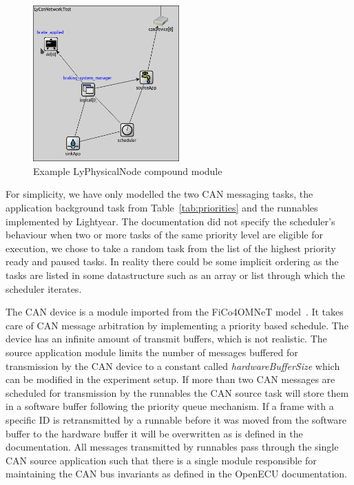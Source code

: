 \begin{figure}[htb]
    \centering
    \includegraphics[width=0.5\textwidth]{images/LyPhysicalNode_example.png}
    \caption{Example LyPhysicalNode compound module}
    \label{fig:lyphysicalnode}
\end{figure}

For simplicity, we have only modelled the two CAN messaging tasks, the application background task from Table~\ref{tab:priorities} and the runnables implemented by Lightyear. The documentation did not specify the scheduler's behaviour when two or more tasks of the same priority level are eligible for execution, we chose to take a random task from the list of the highest priority ready and paused tasks. In reality there could be some implicit ordering as the tasks are listed in some datastructure such as an array or list through which the scheduler iterates. 

The CAN device is a module imported from the FiCo4OMNeT model~\cite{meyer2019simulation}. It takes care of CAN message arbitration by implementing a priority based schedule. The device has an infinite amount of transmit buffers, which is not realistic. The source application module limits the number of messages buffered for transmission by the CAN device to a constant called \textit{hardwareBufferSize} which can be modified in the experiment setup. If more than two CAN messages are scheduled for transmission by the runnables the CAN source task will store them in a software buffer following the priority queue mechanism. If a frame with a specific ID is retransmitted by a runnable before it was moved from the software buffer to the hardware buffer it will be overwritten as is defined in the documentation. All messages transmitted by runnables pass through the single CAN source application such that there is a single module responsible for maintaining the CAN bus invariants as defined in the OpenECU documentation.

